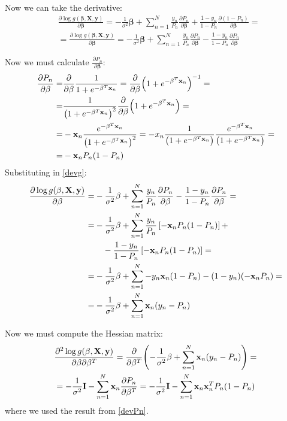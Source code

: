 \documentclass[12pt, letterpaper]{article}
\theoremstyle{definition}
\newcommand{\X}{\mathrm{\mathbf{X}}}
\newcommand{\I}{\mathrm{\mathbf{I}}}
\newcommand{\y}{\mathbf{y}}
\newcommand{\be}{\mathbf{\beta}}
\newcommand{\x}{\mathbf{x}}
\DeclarePairedDelimiter\autobracket{(}{)}
\newcommand{\br}[1]{\autobracket*{#1}}
\begin{document}
Now we can take the derivative:
\begin{equation}
\label{devg}
\begin{aligned}
&\frac{\partial \log g(\be,\X,\y)}{\partial \be} = - \frac{1}{\sigma^2} \be + \sum_{n=1}^N \frac{y_n}{P_n}\frac{\partial P_n}{\partial \be} + \frac{1-y_n}{1-P_n}\frac{\partial (1-P_n)}{\partial \be} =\\
&=\frac{\partial \log g(\be,\X,\y)}{\partial \be} = - \frac{1}{\sigma^2} \be + \sum_{n=1}^N \frac{y_n}{P_n}\frac{\partial P_n}{\partial \be} - \frac{1-y_n}{1-P_n}\frac{\partial P_n}{\partial \be}
\end{aligned}
\end{equation}

Now we must calculate $\frac{\partial P_n}{\partial \be}$:
\begin{equation}
\label{devPn}
\begin{aligned}
\frac{\partial P_n}{\partial \be} =& \frac{\partial}{\partial \be} \frac{1}{1+e^{-\be^T\x_n}} = \frac{\partial}{\partial \be} \br{1+e^{-\be^T\x_n}}^{-1} =\\
=& \frac{1}{\br{1+e^{-\be^T\x_n}}^2}  \frac{\partial}{\partial \be} \br{1+e^{-\be^T\x_n}} = \\
=&  -\x_n \frac{e^{-\be^T\x_n}}{\br{1+e^{-\be^T\x_n}}^2}   = -x_n \frac{1}{\br{1+e^{-\be^T\x_n}}}\frac{e^{-\be^T\x_n}}{\br{1+e^{-\be^T\x_n}}} =\\
=& -\x_nP_n \br{1-P_n}
\end{aligned}
\end{equation}
Substituting in \ref{devg}:
\begin{equation}
\begin{aligned}
\frac{\partial \log g(\be,\X,\y)}{\partial \be} =&  - \frac{1}{\sigma^2} \be + \sum_{n=1}^N \frac{y_n}{P_n}\frac{\partial P_n}{\partial \be} - \frac{1-y_n}{1-P_n}\frac{\partial P_n}{\partial \be} =\\
=&- \frac{1}{\sigma^2} \be + \sum_{n=1}^N \frac{y_n}{P_n}\left[-\x_nP_n \br{1-P_n}\right]+ \\
&\quad  - \frac{1-y_n}{1-P_n}\left[-\x_nP_n \br{1-P_n}\right] =\\
=& - \frac{1}{\sigma^2} \be + \sum_{n=1}^N -y_n\x_n \br{1-P_n} - (1-y_n)(-\x_nP_n ) = \\
=& - \frac{1}{\sigma^2} \be + \sum_{n=1}^N \x_n (y_n-P_n)
\end{aligned}
\end{equation}

Now we must compute the Hessian matrix:
\begin{equation}
\begin{aligned}
&\frac{\partial^2 \log g(\be,\X,\y)}{\partial \be \partial\be^T}  = \frac{\partial}{\partial \be^T} \br{- \frac{1}{\sigma^2} \be + \sum_{n=1}^N \x_n (y_n-P_n)} =
\\ &=- \frac{1}{\sigma^2} \I -\sum_{n=1}^N \x_n \frac{\partial P_n}{\partial \be^T} = - \frac{1}{\sigma^2} \I - \sum_{n=1}^N \x_n \x_n^TP_n \br{1-P_n}
\end{aligned}
\end{equation}
where we used the result from \ref{devPn}.
\end{document}
